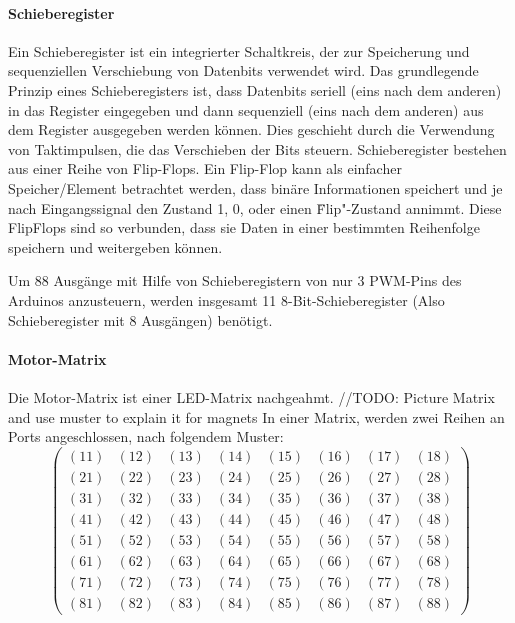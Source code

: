 \paragraph{Schieberegister}
Ein Schieberegister ist ein integrierter Schaltkreis, der zur Speicherung und sequenziellen Verschiebung von
Datenbits verwendet wird.\newline
Das grundlegende Prinzip eines Schieberegisters ist, dass Datenbits seriell (eins nach dem anderen) in das Register
eingegeben und dann sequenziell (eins nach dem anderen) aus dem Register ausgegeben werden können. Dies geschieht durch
die Verwendung von Taktimpulsen, die das Verschieben der Bits steuern.\newline
Schieberegister bestehen aus einer Reihe von Flip-Flops. Ein Flip-Flop kann als einfacher Speicher/Element betrachtet werden, dass
binäre Informationen speichert und je nach Eingangssignal den Zustand 1, 0, oder einen \"Flip"-Zustand annimmt. Diese
FlipFlops sind so verbunden, dass sie Daten in einer bestimmten Reihenfolge speichern und weitergeben können. \newline

Um 88 Ausgänge mit Hilfe von Schieberegistern von nur 3 PWM-Pins des Arduinos anzusteuern, werden insgesamt 11 8-Bit-Schieberegister
(Also Schieberegister mit 8 Ausgängen) benötigt.\newline

\paragraph{Motor-Matrix}
Die Motor-Matrix ist einer LED-Matrix nachgeahmt. //TODO: Picture Matrix and use muster to explain it for magnets
In einer Matrix, werden zwei Reihen an Ports angeschlossen, nach folgendem Muster:
$$
\begin{pmatrix}
	(11) & (12) & (13) & (14) & (15) & (16) & (17) & (18) \\
	(21) & (22) & (23) & (24) & (25) & (26) & (27) & (28) \\
	(31) & (32) & (33) & (34) & (35) & (36) & (37) & (38) \\
	(41) & (42) & (43) & (44) & (45) & (46) & (47) & (48) \\
	(51) & (52) & (53) & (54) & (55) & (56) & (57) & (58) \\
	(61) & (62) & (63) & (64) & (65) & (66) & (67) & (68) \\
	(71) & (72) & (73) & (74) & (75) & (76) & (77) & (78) \\
	(81) & (82) & (83) & (84) & (85) & (86) & (87) & (88)
\end{pmatrix}
$$


